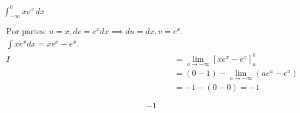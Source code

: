 $\displaystyle \int_{-\infty}^{0} xe^x\,dx$

\nopagebreak
\begin{align*}
\text{Por partes: } u=x, dv=e^x dx \implies du=dx, v=e^x. \\
\int xe^x dx = xe^x - e^x. \\
I &= \lim_{a \to -\infty} [xe^x - e^x]_{a}^{0} \\
&= (0 - 1) - \lim_{a \to -\infty} (ae^a - e^a) \\
&= -1 - (0 - 0) = -1
\end{align*}

\[
\boxed{\displaystyle -1}
\]
